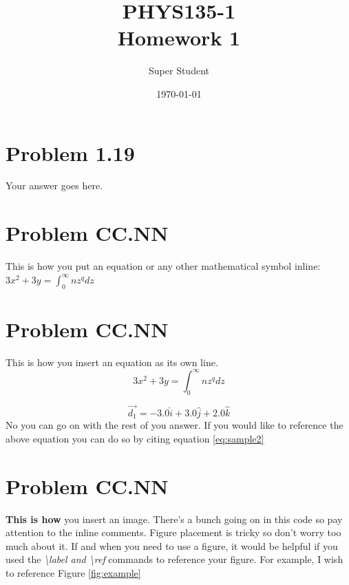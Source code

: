 \documentclass[letterpaper,12pt]{article}
\title{PHYS135-1 \\ Homework 1}
\author{Super Student}
\date{\today}
\begin{document}
\maketitle


\newpage
\section{Problem 1.19}

Your answer goes here.

\newpage
\section{Problem CC.NN}

This is how you put an equation or any other mathematical symbol inline: $3x^2 +3y = \int^\infty_0 nz^q dz$

\newpage
\section{Problem CC.NN}

This is how you insert an equation as its own line.
\begin{equation}
    3x^2 +3y = \int^\infty_0 nz^q dz
    \label{eq:example}
\end{equation}

\begin{equation}
    \Vec{d_1}=-3.0\hat{i}+3.0\hat{j}+2.0\hat{k}
    \label{eq:sample2}
\end{equation}
No you can go on with the rest of you answer. If you would like to reference the above equation you can do so by citing equation \ref{eq:sample2}

\newpage
\section{Problem CC.NN}
\textbf{This is how} you insert an image. There's a bunch going on in this code so pay attention to the inline comments. Figure placement is tricky so don't worry too much about it. If and when you need to use a figure, it would be helpful if you used the \emph{\textbackslash label and \textbackslash ref} commands to reference your figure. For example, I wish to reference Figure \ref{fig:example}
\end{document}
